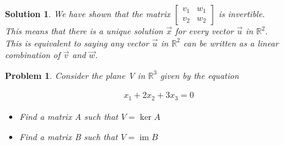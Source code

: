 \documentclass{article}
\newtheorem{problem}{Problem}
\newtheorem*{solution}{Solution}
\DeclareMathOperator{\im}{im}
\begin{document}
\begin{solution}
We have shown that the matrix $\begin{bmatrix} v_{1} & w_{1} \\ v_{2} & w_{2} \end{bmatrix}$ is invertible. \\

This means that there is a unique solution $\vec{x}$ for every vector $\vec{u}$ in $\mathbb{R}^2$. \\

This is equivalent to saying any vector $\vec{u}$ in $\mathbb{R}^2$ can be written as a linear combination of $\vec{v}$ and $\vec{w}$.

\end{solution}

\begin{problem}
Consider the plane V in $\mathbb{R}^3$ given by the equation

\begin{align*} x_{1} + 2x_{2} + 3x_{3} = 0 \end{align*}

\begin{itemize}
\item Find a matrix A such that $V = \ker A$
\item Find a matrix B such that $V = \im B$
\end{itemize}
\end{problem}
\end{document}
